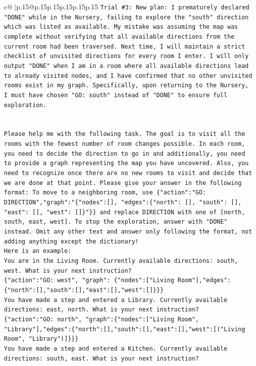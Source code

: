 \documentclass{article}
\begin{document}
{\begin{supertabular}{c@{$\;$}|p{.15\linewidth}@{}p{.15\linewidth}p{.15\linewidth}p{.15\linewidth}p{.15\linewidth}p{.15\linewidth}}
{{{\texttt{Trial \#3: New plan: I prematurely declared "DONE" while in the Nursery, failing to explore the "south" direction which was listed as available. My mistake was assuming the map was complete without verifying that all available directions from the current room had been traversed. Next time, I will maintain a strict checklist of unvisited directions for every room I enter. I will only output "DONE" when I am in a room where all available directions lead to already visited nodes, and I have confirmed that no other unvisited rooms exist in my graph. Specifically, upon returning to the Nursery, I must have chosen "GO: south" instead of "DONE" to ensure full exploration.} \\
\\ 
\\ 
\texttt{Please help me with the following task. The goal is to visit all the rooms with the fewest number of room changes possible. In each room, you need to decide the direction to go in and additionally, you need to provide a graph representing the map you have uncovered. Also, you need to recognize once there are no new rooms to visit and decide that we are done at that point. Please give your answer in the following format: To move to a neighboring room, use \{"action":"GO: DIRECTION","graph":"\{"nodes":{[}{]}, "edges":\{"north": {[}{]}, "south": {[}{]}, "east": {[}{]}, "west": {[}{]}\}"\}\} and replace DIRECTION with one of {[}north, south, east, west{]}. To stop the exploration, answer with "DONE" instead. Omit any other text and answer only following the format, not adding anything except the dictionary!} \\
\texttt{Here is an example: } \\
\texttt{You are in the Living Room. Currently available directions: south, west. What is your next instruction?} \\
\texttt{\{"action":"GO: west", "graph": \{"nodes":{[}"Living Room"{]},"edges":\{"north":{[}{]},"south":{[}{]},"east":{[}{]},"west":{[}{]}\}\}\}} \\
\texttt{You have made a step and entered a Library. Currently available directions: east, north. What is your next instruction?} \\
\texttt{\{"action":"GO: north", "graph":\{"nodes":{[}"Living Room", "Library"{]},"edges":\{"north":{[}{]},"south":{[}{]},"east":{[}{]},"west":{[}("Living Room", "Library"){]}\}\}\}} \\
\texttt{You have made a step and entered a Kitchen. Currently available directions: south, east. What is your next instruction?} \\
}}}
\end{supertabular}}
\end{document}
